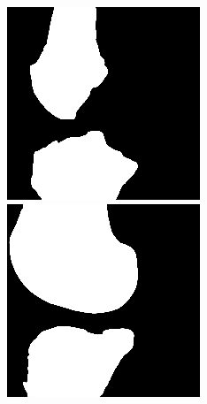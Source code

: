 \begin{figure}[H]
\endminipage\hfill
{}
  \includegraphics[width=\linewidth]{imgs/transfer_pers_y2.png}
\endminipage\hfill
{}%
  \includegraphics[width=\linewidth]{imgs/transfer_pers_y3.png}

\end{figure}
